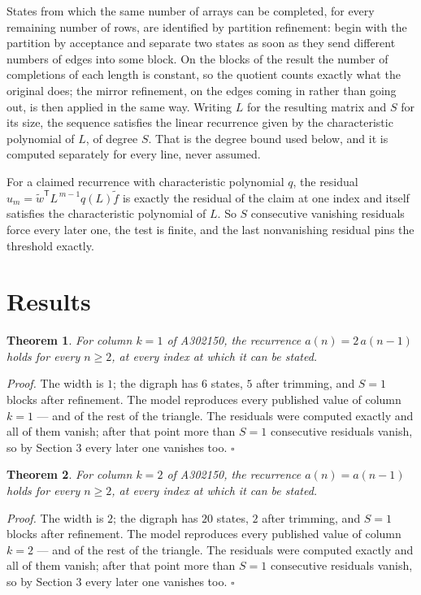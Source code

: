 \documentclass[11pt]{article}
\newtheorem{theorem}{Theorem}
\theoremstyle{definition}
\begin{document}
States from which the same number of arrays can be completed, for every remaining number of rows, are identified by partition refinement: begin with the partition by acceptance and separate two states as soon as they send different numbers of edges into some block. On the blocks of the result the number of completions of each length is constant, so the quotient counts exactly what the original does; the mirror refinement, on the edges coming in rather than going out, is then applied in the same way. Writing $L$ for the resulting matrix and $S$ for its size, the sequence satisfies the linear recurrence given by the characteristic polynomial of $L$, of degree $S$. That is the degree bound used below, and it is computed separately for every line, never assumed.

For a claimed recurrence with characteristic polynomial $q$, the residual $u_m = \tilde w^{\mathsf T}L^{\,m-1}q(L)\tilde f$ is exactly the residual of the claim at one index and itself satisfies the characteristic polynomial of $L$. So $S$ consecutive vanishing residuals force every later one, the test is finite, and the last nonvanishing residual pins the threshold exactly.

\section{Results}

\begin{theorem} For column $k = 1$ of A302150, the recurrence $a(n) = 2\,a(n-1)$ holds for every $n \ge 2$, at every index at which it can be stated.\end{theorem}

{\itshape Proof.} The width is $1$; the digraph has $6$ states, $5$ after trimming, and $S = 1$ blocks after refinement. The model reproduces every published value of column $k = 1$ --- and of the rest of the triangle. The residuals were computed exactly and all of them vanish; after that point more than $S = 1$ consecutive residuals vanish, so by Section 3 every later one vanishes too. $\square$

\begin{theorem} For column $k = 2$ of A302150, the recurrence $a(n) = a(n-1)$ holds for every $n \ge 2$, at every index at which it can be stated.\end{theorem}

{\itshape Proof.} The width is $2$; the digraph has $20$ states, $2$ after trimming, and $S = 1$ blocks after refinement. The model reproduces every published value of column $k = 2$ --- and of the rest of the triangle. The residuals were computed exactly and all of them vanish; after that point more than $S = 1$ consecutive residuals vanish, so by Section 3 every later one vanishes too. $\square$
\end{document}
